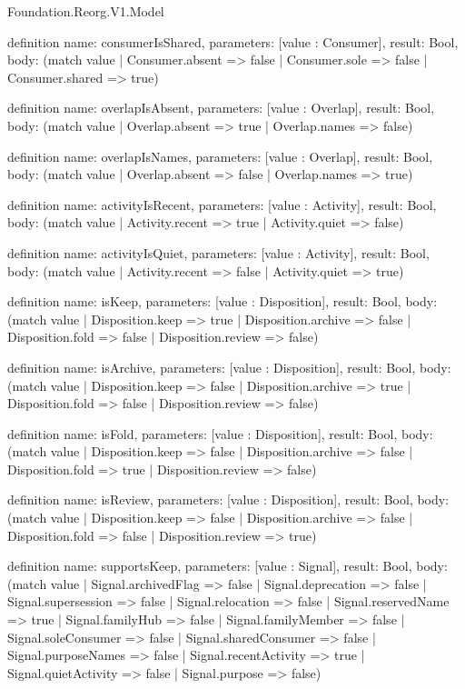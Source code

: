 \begin{lexlean}{Foundation.Reorg.V1.Model}
\begin{semanticmodule}
definition{
  name: consumerIsShared,
  parameters: [value : Consumer],
  result: Bool,
  body: (match value | Consumer.absent => false | Consumer.sole => false | Consumer.shared => true)
}

definition{
  name: overlapIsAbsent,
  parameters: [value : Overlap],
  result: Bool,
  body: (match value | Overlap.absent => true | Overlap.names => false)
}

definition{
  name: overlapIsNames,
  parameters: [value : Overlap],
  result: Bool,
  body: (match value | Overlap.absent => false | Overlap.names => true)
}

definition{
  name: activityIsRecent,
  parameters: [value : Activity],
  result: Bool,
  body: (match value | Activity.recent => true | Activity.quiet => false)
}

definition{
  name: activityIsQuiet,
  parameters: [value : Activity],
  result: Bool,
  body: (match value | Activity.recent => false | Activity.quiet => true)
}

definition{
  name: isKeep,
  parameters: [value : Disposition],
  result: Bool,
  body: (match value
    | Disposition.keep => true
    | Disposition.archive => false
    | Disposition.fold => false
    | Disposition.review => false)
}

definition{
  name: isArchive,
  parameters: [value : Disposition],
  result: Bool,
  body: (match value
    | Disposition.keep => false
    | Disposition.archive => true
    | Disposition.fold => false
    | Disposition.review => false)
}

definition{
  name: isFold,
  parameters: [value : Disposition],
  result: Bool,
  body: (match value
    | Disposition.keep => false
    | Disposition.archive => false
    | Disposition.fold => true
    | Disposition.review => false)
}

definition{
  name: isReview,
  parameters: [value : Disposition],
  result: Bool,
  body: (match value
    | Disposition.keep => false
    | Disposition.archive => false
    | Disposition.fold => false
    | Disposition.review => true)
}

definition{
  name: supportsKeep,
  parameters: [value : Signal],
  result: Bool,
  body: (match value
    | Signal.archivedFlag => false
    | Signal.deprecation => false
    | Signal.supersession => false
    | Signal.relocation => false
    | Signal.reservedName => true
    | Signal.familyHub => false
    | Signal.familyMember => false
    | Signal.soleConsumer => false
    | Signal.sharedConsumer => false
    | Signal.purposeNames => false
    | Signal.recentActivity => true
    | Signal.quietActivity => false
    | Signal.purpose => false)
}


\end{semanticmodule}
\end{lexlean}
